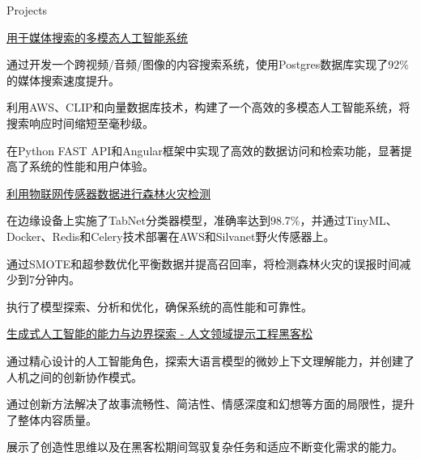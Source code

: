 \documentclass{resume} %
\begin{document}
    \begin{rSection}{Projects}
                    \begin{rSubsection}
                                    {\href{https://devpost.com/software/team{-}soul{-}1fjgwo}{用于媒体搜索的多模态人工智能系统}}
                                {}{}{}
                                    \item 通过开发一个跨视频/音频/图像的内容搜索系统，使用Postgres数据库实现了92\%的媒体搜索速度提升。
                                    \item 利用AWS、CLIP和向量数据库技术，构建了一个高效的多模态人工智能系统，将搜索响应时间缩短至毫秒级。
                                    \item 在Python FAST API和Angular框架中实现了高效的数据访问和检索功能，显著提高了系统的性能和用户体验。
                            \end{rSubsection}
                    \begin{rSubsection}
                                    {\href{https://github.com/OmdenaAI/Dryad}{利用物联网传感器数据进行森林火灾检测}}
                                {}{}{}
                                    \item 在边缘设备上实施了TabNet分类器模型，准确率达到98.7\%，并通过TinyML、Docker、Redis和Celery技术部署在AWS和Silvanet野火传感器上。
                                    \item 通过SMOTE和超参数优化平衡数据并提高召回率，将检测森林火灾的误报时间减少到7分钟内。
                                    \item 执行了模型探索、分析和优化，确保系统的高性能和可靠性。
                            \end{rSubsection}
                    \begin{rSubsection}
                                    {\href{https://www.linkedin.com/pulse/exploring{-}depths{-}ai{-}story{-}writing{-}prompt{-}engineering{-}hackathon{-}wbqwc}{生成式人工智能的能力与边界探索 {-} 人文领域提示工程黑客松}}
                                {}{}{}
                                    \item 通过精心设计的人工智能角色，探索大语言模型的微妙上下文理解能力，并创建了人机之间的创新协作模式。
                                    \item 通过创新方法解决了故事流畅性、简洁性、情感深度和幻想等方面的局限性，提升了整体内容质量。
                                    \item 展示了创造性思维以及在黑客松期间驾驭复杂任务和适应不断变化需求的能力。
                            \end{rSubsection}
            \end{rSection}
\end{document}
